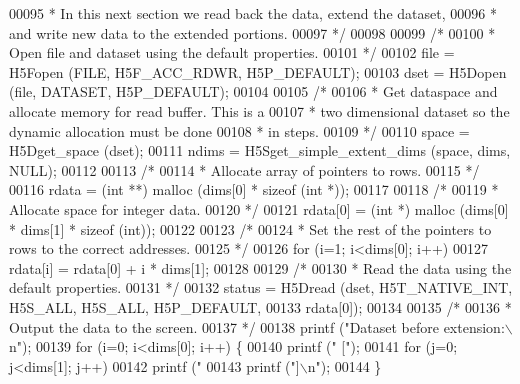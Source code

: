 \begin{DoxyCode}
00095 \textcolor{comment}{     * In this next section we read back the data, extend the dataset,}
00096 \textcolor{comment}{     * and write new data to the extended portions.}
00097 \textcolor{comment}{     */}
00098 
00099     \textcolor{comment}{/*}
00100 \textcolor{comment}{     * Open file and dataset using the default properties.}
00101 \textcolor{comment}{     */}
00102     file = H5Fopen (FILE, H5F\_ACC\_RDWR, H5P\_DEFAULT);
00103     dset = H5Dopen (file, DATASET, H5P\_DEFAULT);
00104 
00105     \textcolor{comment}{/*}
00106 \textcolor{comment}{     * Get dataspace and allocate memory for read buffer.  This is a}
00107 \textcolor{comment}{     * two dimensional dataset so the dynamic allocation must be done}
00108 \textcolor{comment}{     * in steps.}
00109 \textcolor{comment}{     */}
00110     space = H5Dget\_space (dset);
00111     ndims = H5Sget\_simple\_extent\_dims (space, dims, NULL);
00112 
00113     \textcolor{comment}{/*}
00114 \textcolor{comment}{     * Allocate array of pointers to rows.}
00115 \textcolor{comment}{     */}
00116     rdata = (\textcolor{keywordtype}{int} **) malloc (dims[0] * \textcolor{keyword}{sizeof} (\textcolor{keywordtype}{int} *));
00117 
00118     \textcolor{comment}{/*}
00119 \textcolor{comment}{     * Allocate space for integer data.}
00120 \textcolor{comment}{     */}
00121     rdata[0] = (\textcolor{keywordtype}{int} *) malloc (dims[0] * dims[1] * \textcolor{keyword}{sizeof} (\textcolor{keywordtype}{int}));
00122 
00123     \textcolor{comment}{/*}
00124 \textcolor{comment}{     * Set the rest of the pointers to rows to the correct addresses.}
00125 \textcolor{comment}{     */}
00126     \textcolor{keywordflow}{for} (i=1; i<dims[0]; i++)
00127         rdata[i] = rdata[0] + i * dims[1];
00128 
00129     \textcolor{comment}{/*}
00130 \textcolor{comment}{     * Read the data using the default properties.}
00131 \textcolor{comment}{     */}
00132     status = H5Dread (dset, H5T\_NATIVE\_INT, H5S\_ALL, H5S\_ALL, H5P\_DEFAULT,
00133                 rdata[0]);
00134 
00135     \textcolor{comment}{/*}
00136 \textcolor{comment}{     * Output the data to the screen.}
00137 \textcolor{comment}{     */}
00138     printf (\textcolor{stringliteral}{"Dataset before extension:\(\backslash\)n"});
00139     \textcolor{keywordflow}{for} (i=0; i<dims[0]; i++) \{
00140         printf (\textcolor{stringliteral}{" ["});
00141         \textcolor{keywordflow}{for} (j=0; j<dims[1]; j++)
00142             printf (\textcolor{stringliteral}{" %
00143         printf (\textcolor{stringliteral}{"]\(\backslash\)n"});
00144     \}
}
\end{DoxyCode}

